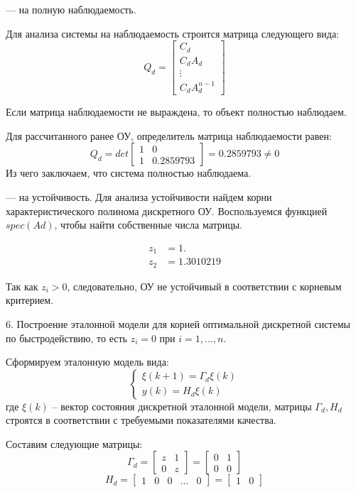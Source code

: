 \documentclass[a4paper,14pt]{extreport}
\begin{document}
— на полную наблюдаемость.

Для анализа системы на наблюдаемость строится матрица следующего вида:
\begin{equation}
Q_d =
\begin{bmatrix}
C_d\\
C_d A_d\\
\vdots\\

C_d A_d^{n-1}
\end{bmatrix}
\end{equation}

Если матрица наблюдаемости не выраждена, то объект полностью наблюдаем.

Для рассчитанного ранее ОУ, определитель матрица наблюдаемости равен:
\begin{equation}
Q_d =det
\begin{bmatrix}
1&    0\\         
1 &   0.2859793  
\end{bmatrix}
=0.2859793  \ne 0
\end{equation}
Из чего заключаем, что система полностью наблюдаема.

— на устойчивость.
Для анализа устойчивости найдем корни характеристического полинома дискретного ОУ. Воспользуемся функцией $spec(Ad)$, чтобы найти собственные числа матрицы.

\begin{align}
	 z_1 &= 1. \\ 
	z_2 &= 1.3010219  
\end{align}

Так как $z_i > 0$, следовательно, ОУ не устойчивый в соответствии с
корневым критерием.

6. Построение эталонной модели для корней оптимальной дискретной системы по быстродействию, то есть $z_i = 0$ при $i = 1,...,n$.

Сформируем эталонную модель вида:
\begin{equation}
	\begin{cases}
	\xi(k+1) = \Gamma_d \xi(k)\\
	y(k) = H_d \xi(k)
	\end{cases}
\end{equation}
где $\xi(k)$ -- вектор состояния дискретной эталонной модели, матрицы $\Gamma_d, H_d$ строятся в соответствии с требуемыми показателями качества.

Составим следующие матрицы:
\begin{equation}
\Gamma_d = 
\begin{bmatrix}
z & 1\\
0 & z
\end{bmatrix}
=
\begin{bmatrix}
0 & 1\\
0 & 0
\end{bmatrix}
\end{equation}
\begin{equation}
H_d = 
\begin{bmatrix}
1&0&0& \dots &0
\end{bmatrix}
=
\begin{bmatrix}
1 & 0
\end{bmatrix}
\end{equation}
\end{document}

